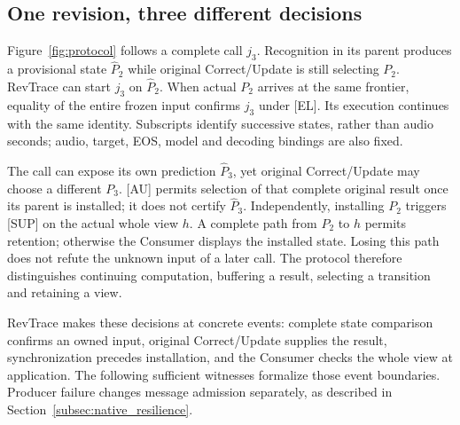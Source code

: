\subsection{One revision, three different decisions}
Figure~\ref{fig:protocol} follows a complete call $j_3$. Recognition in
its parent produces a provisional state $\widehat P_2$ while original
Correct/Update is still selecting $P_2$. RevTrace can start $j_3$ on
$\widehat P_2$. When actual $P_2$ arrives at the same frontier, equality
of the entire frozen input confirms $j_3$ under [EL]. Its execution
continues with the same identity. Subscripts identify successive states,
rather than audio seconds; audio, target, EOS, model and decoding bindings
are also fixed.

The call can expose its own prediction $\widehat P_3$, yet original
Correct/Update may choose a different $P_3$. [AU] permits selection of
that complete original result once its parent is installed; it does not
certify $\widehat P_3$. Independently, installing $P_2$ triggers [SUP]
on the actual whole view $h$. A complete path from $P_2$ to $h$ permits
retention; otherwise the Consumer displays the installed state. Losing
this path does not refute the unknown input of a later call. The protocol
therefore distinguishes continuing computation, buffering a result,
selecting a transition and retaining a view.

RevTrace makes these decisions at concrete events: complete state
comparison confirms an owned input, original Correct/Update supplies the
result, synchronization precedes installation, and the Consumer checks
the whole view at application. The following sufficient witnesses
formalize those event boundaries. Producer
failure changes message admission separately, as described in
Section~\ref{subsec:native_resilience}.

